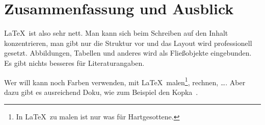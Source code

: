 \documentclass[11pt,a4paper]{article} %
\begin{document}
\section{Zusammenfassung und Ausblick}

\LaTeX\ ist also sehr nett.
Man kann sich beim Schreiben auf den Inhalt konzentrieren,
man gibt nur die Struktur vor und das Layout wird professionell gesetzt.
Abbildungen, Tabellen und anderes wird als Fließobjekte eingebunden.
Es gibt nichts besseres für Literaturangaben.

Wer will kann noch Farben verwenden, mit \LaTeX\ 
malen\footnote{In \LaTeX\ zu malen ist nur was für Hartgesottene.},
rechnen, \ldots.
Aber dazu gibt es ausreichend Doku,
wie zum Beispiel den Kopka~\cite{kopka}.




\end{document}
